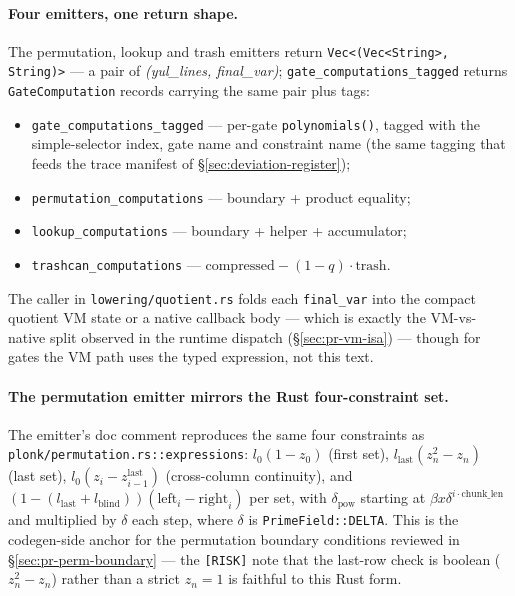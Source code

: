 \paragraph{Four emitters, one return shape.}
The permutation, lookup and trash emitters return
\texttt{Vec<(Vec<String>, String)>} --- a pair of
\emph{(yul\_lines, final\_var)}; \texttt{gate\_\allowbreak{}computations\_\allowbreak{}tagged}
returns \texttt{GateComputation} records carrying the same pair
plus tags:
\begin{itemize}
\item \texttt{gate\_\allowbreak{}computations\_\allowbreak{}tagged} --- per-gate
\texttt{polynomials()}, tagged with the simple-selector index,
gate name and constraint name (the same tagging that feeds the
trace manifest of §\ref{sec:deviation-register});
\item \texttt{permutation\_\allowbreak{}computations} --- boundary + product
equality;
\item \texttt{lookup\_\allowbreak{}computations} --- boundary + helper +
accumulator;
\item \texttt{trashcan\_\allowbreak{}computations} ---
$\text{compressed} - (1-q)\cdot\text{trash}$.
\end{itemize}
The caller in \texttt{lowering/\allowbreak{}quotient.rs} folds each
\texttt{final\_var} into the compact quotient VM state or a native
callback body --- which is exactly the VM-vs-native split observed
in the runtime dispatch (§\ref{sec:pr-vm-isa}) --- though for
gates the VM path uses the typed expression, not this text.

\paragraph{The permutation emitter mirrors the Rust four-constraint set.}
The emitter's doc comment reproduces the same four constraints as
\texttt{plonk/\allowbreak{}permutation.rs::expressions}:
$l_0(1-z_0)$ (first set), $l_\text{last}(z_n^2-z_n)$ (last set),
$l_0(z_i - z_{i-1}^{\text{last}})$ (cross-column continuity), and
$(1-(l_\text{last}+l_\text{blind}))(\text{left}_i-\text{right}_i)$
per set, with
$\delta_\text{pow}$ starting at $\beta x\delta^{i\cdot\text{chunk\_len}}$
and multiplied by $\delta$ each step, where $\delta$ is
\texttt{PrimeField::DELTA}. This is the codegen-side anchor for
the permutation boundary conditions reviewed in
§\ref{sec:pr-perm-boundary} --- the \texttt{[RISK]} note that the
last-row check is boolean ($z_n^2-z_n$) rather than a strict
$z_n=1$ is faithful to this Rust form.

